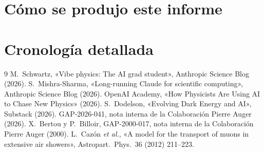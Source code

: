 \documentclass[11pt,a4paper]{article}
\begin{document}
\appendix
\section{Cómo se produjo este informe}\label{ap:metodo}


\section{Cronología detallada}\label{ap:crono}


\begin{thebibliography}{9}
 M.~Schwartz, «Vibe physics: The AI grad student», Anthropic Science Blog (2026).
 S.~Mishra-Sharma, «Long-running Claude for scientific computing», Anthropic Science Blog (2026).
 OpenAI Academy, «How Physicists Are Using AI to Chase New Physics» (2026).
 S.~Dodelson, «Evolving Dark Energy and AI», Substack (2026).
 GAP-2026-041, nota interna de la Colaboración Pierre Auger (2026).
 X.~Bertou y P.~Billoir, GAP-2000-017, nota interna de la Colaboración Pierre Auger (2000).
 L.~Cazón \emph{et al.}, «A model for the transport of muons in extensive air showers», Astropart.\ Phys.\ 36 (2012) 211--223.
\end{thebibliography}
\end{document}
